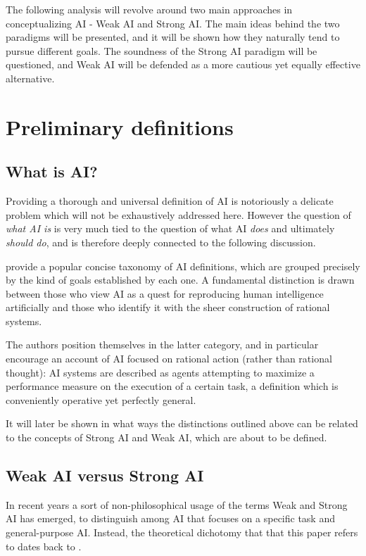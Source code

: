 \documentclass{article}
\begin{document}
The following analysis will revolve around two main approaches in conceptualizing AI - Weak AI and Strong AI. The main ideas behind the two paradigms will be presented, and it will be shown how they naturally tend to pursue different goals. The soundness of the Strong AI paradigm will be questioned, and Weak AI will be defended as a more cautious yet equally effective alternative.

\section{Preliminary definitions}

\subsection{What is AI?}

Providing a thorough and universal definition of AI is notoriously a delicate problem which will not be exhaustively addressed here. However the question of \textit{what AI is} is very much tied to the question of what AI \textit{does} and ultimately \textit{should do}, and is therefore deeply connected to the following discussion.

\cite{russell2016artificial} provide a popular concise taxonomy of AI definitions, which are grouped precisely by the kind of goals established by each one. A fundamental distinction is drawn between those who view AI as a quest for reproducing human intelligence artificially and those who identify it with the sheer construction of rational systems.

The authors position themselves in the latter category, and in particular encourage an account of AI focused on rational action (rather than rational thought): AI systems are described as agents attempting to maximize a performance measure on the execution of a certain task, a definition which is conveniently operative yet perfectly general.

It will later be shown in what ways the distinctions outlined above can be related to the concepts of Strong AI and Weak AI, which are about to be defined.

\subsection{Weak AI versus Strong AI}

In recent years a sort of non-philosophical usage of the terms Weak and Strong AI has emerged, to distinguish among AI that focuses on a specific task and general-purpose AI. Instead, the theoretical dichotomy that that this paper refers to dates back to \citep{searle1980minds}.
\end{document}
